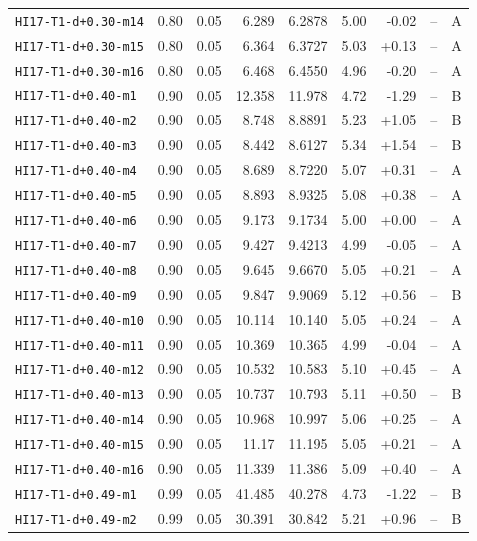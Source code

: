 \begin{longtable}{@{}lrrrrrrrc@{}}
\texttt{HI17-T1-d+0.30-m14} & 0.80 & 0.05 & 6.289 & 6.2878 & 5.00 & -0.02 & -- & A\\
\texttt{HI17-T1-d+0.30-m15} & 0.80 & 0.05 & 6.364 & 6.3727 & 5.03 & +0.13 & -- & A\\
\texttt{HI17-T1-d+0.30-m16} & 0.80 & 0.05 & 6.468 & 6.4550 & 4.96 & -0.20 & -- & A\\
\texttt{HI17-T1-d+0.40-m1} & 0.90 & 0.05 & 12.358 & 11.978 & 4.72 & -1.29 & -- & B\\
\texttt{HI17-T1-d+0.40-m2} & 0.90 & 0.05 & 8.748 & 8.8891 & 5.23 & +1.05 & -- & B\\
\texttt{HI17-T1-d+0.40-m3} & 0.90 & 0.05 & 8.442 & 8.6127 & 5.34 & +1.54 & -- & B\\
\texttt{HI17-T1-d+0.40-m4} & 0.90 & 0.05 & 8.689 & 8.7220 & 5.07 & +0.31 & -- & A\\
\texttt{HI17-T1-d+0.40-m5} & 0.90 & 0.05 & 8.893 & 8.9325 & 5.08 & +0.38 & -- & A\\
\texttt{HI17-T1-d+0.40-m6} & 0.90 & 0.05 & 9.173 & 9.1734 & 5.00 & +0.00 & -- & A\\
\texttt{HI17-T1-d+0.40-m7} & 0.90 & 0.05 & 9.427 & 9.4213 & 4.99 & -0.05 & -- & A\\
\texttt{HI17-T1-d+0.40-m8} & 0.90 & 0.05 & 9.645 & 9.6670 & 5.05 & +0.21 & -- & A\\
\texttt{HI17-T1-d+0.40-m9} & 0.90 & 0.05 & 9.847 & 9.9069 & 5.12 & +0.56 & -- & B\\
\texttt{HI17-T1-d+0.40-m10} & 0.90 & 0.05 & 10.114 & 10.140 & 5.05 & +0.24 & -- & A\\
\texttt{HI17-T1-d+0.40-m11} & 0.90 & 0.05 & 10.369 & 10.365 & 4.99 & -0.04 & -- & A\\
\texttt{HI17-T1-d+0.40-m12} & 0.90 & 0.05 & 10.532 & 10.583 & 5.10 & +0.45 & -- & A\\
\texttt{HI17-T1-d+0.40-m13} & 0.90 & 0.05 & 10.737 & 10.793 & 5.11 & +0.50 & -- & B\\
\texttt{HI17-T1-d+0.40-m14} & 0.90 & 0.05 & 10.968 & 10.997 & 5.06 & +0.25 & -- & A\\
\texttt{HI17-T1-d+0.40-m15} & 0.90 & 0.05 & 11.17 & 11.195 & 5.05 & +0.21 & -- & A\\
\texttt{HI17-T1-d+0.40-m16} & 0.90 & 0.05 & 11.339 & 11.386 & 5.09 & +0.40 & -- & A\\
\texttt{HI17-T1-d+0.49-m1} & 0.99 & 0.05 & 41.485 & 40.278 & 4.73 & -1.22 & -- & B\\
\texttt{HI17-T1-d+0.49-m2} & 0.99 & 0.05 & 30.391 & 30.842 & 5.21 & +0.96 & -- & B\\

\end{longtable}
